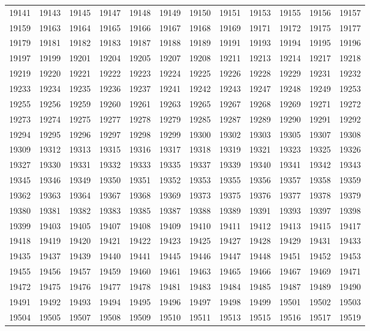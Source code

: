 \begin{center}
\begin{longtable}{llllllllllll}
19141 &19143 &19145 &19147 &19148 &19149 &19150 &19151 &19153 &19155 &19156 &19157 \\
19159 &19163 &19164 &19165 &19166 &19167 &19168 &19169 &19171 &19172 &19175 &19177 \\
19179 &19181 &19182 &19183 &19187 &19188 &19189 &19191 &19193 &19194 &19195 &19196 \\
19197 &19199 &19201 &19204 &19205 &19207 &19208 &19211 &19213 &19214 &19217 &19218 \\
19219 &19220 &19221 &19222 &19223 &19224 &19225 &19226 &19228 &19229 &19231 &19232 \\
19233 &19234 &19235 &19236 &19237 &19241 &19242 &19243 &19247 &19248 &19249 &19253 \\
19255 &19256 &19259 &19260 &19261 &19263 &19265 &19267 &19268 &19269 &19271 &19272 \\
19273 &19274 &19275 &19277 &19278 &19279 &19285 &19287 &19289 &19290 &19291 &19292 \\
19294 &19295 &19296 &19297 &19298 &19299 &19300 &19302 &19303 &19305 &19307 &19308 \\
19309 &19312 &19313 &19315 &19316 &19317 &19318 &19319 &19321 &19323 &19325 &19326 \\
19327 &19330 &19331 &19332 &19333 &19335 &19337 &19339 &19340 &19341 &19342 &19343 \\
19345 &19346 &19349 &19350 &19351 &19352 &19353 &19355 &19356 &19357 &19358 &19359 \\
19362 &19363 &19364 &19367 &19368 &19369 &19373 &19375 &19376 &19377 &19378 &19379 \\
19380 &19381 &19382 &19383 &19385 &19387 &19388 &19389 &19391 &19393 &19397 &19398 \\
19399 &19403 &19405 &19407 &19408 &19409 &19410 &19411 &19412 &19413 &19415 &19417 \\
19418 &19419 &19420 &19421 &19422 &19423 &19425 &19427 &19428 &19429 &19431 &19433 \\
19435 &19437 &19439 &19440 &19441 &19445 &19446 &19447 &19448 &19451 &19452 &19453 \\
19455 &19456 &19457 &19459 &19460 &19461 &19463 &19465 &19466 &19467 &19469 &19471 \\
19472 &19475 &19476 &19477 &19478 &19481 &19483 &19484 &19485 &19487 &19489 &19490 \\
19491 &19492 &19493 &19494 &19495 &19496 &19497 &19498 &19499 &19501 &19502 &19503 \\
19504 &19505 &19507 &19508 &19509 &19510 &19511 &19513 &19515 &19516 &19517 &19519 \\

\end{longtable}
\end{center}
